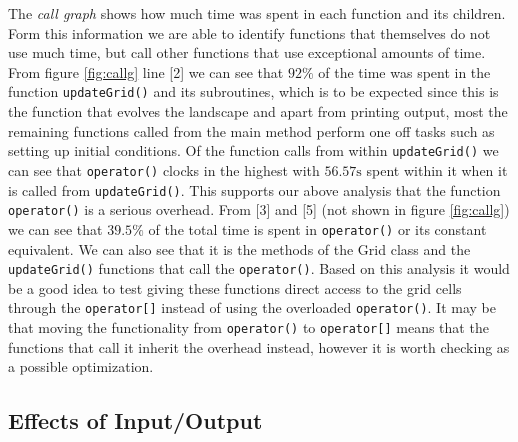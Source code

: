The \textit{call graph} shows how much time was spent in each function and its children. Form this information we are able to identify functions that themselves do not use much time, but call other functions that use exceptional amounts of time. From figure \ref{fig:callg} line [2] we can see that $92\%$ of the time was spent in the function \texttt{updateGrid()} and its subroutines, which is to be expected since this is the function that evolves the landscape and apart from printing output, most the remaining functions called from the main method perform one off tasks such as setting up initial conditions. Of the function calls from within \texttt{updateGrid()} we can see that \texttt{operator()} clocks in the highest with $56.57\text{s}$ spent within it when it is called from \texttt{updateGrid()}. This supports our above analysis that the function \texttt{operator()} is a serious overhead. From [3] and [5] (not shown in figure \ref{fig:callg}) we can see that $39.5\%$ of the total time is spent in \texttt{operator()} or its constant equivalent. We can also see that it is the methods of the Grid class and the \texttt{updateGrid()} functions that call the \texttt{operator()}. Based on this analysis it would be a good idea to test giving these functions direct access to the grid cells through the \texttt{operator[]} instead of using the overloaded \texttt{operator()}. It may be that moving the functionality from \texttt{operator()} to \texttt{operator[]} means that the functions that call it inherit the overhead instead, however it is worth checking as a possible optimization. 

\subsection{Effects of Input/Output}
\label{subsec:input}

